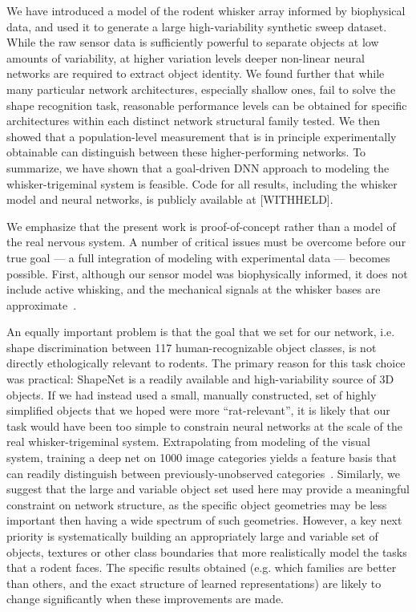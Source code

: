 We have introduced a model of the rodent whisker array informed by biophysical data, and used it to generate a large high-variability synthetic sweep dataset. 
While the raw sensor data is sufficiently powerful to separate objects at low amounts of variability, at higher variation levels deeper non-linear neural networks are required to extract object identity. 
We found further that while many particular network architectures, especially shallow ones, fail to solve the shape recognition task, reasonable performance levels can be obtained for specific architectures within each distinct network structural family tested.
We then showed that a population-level measurement that is in principle experimentally obtainable can distinguish between these higher-performing networks. 
To summarize, we have shown that a goal-driven DNN approach to modeling the whisker-trigeminal system is feasible. 
Code for all results, including the whisker model and neural networks, is publicly available at [WITHHELD].

We emphasize that the present work is proof-of-concept rather than a model of the real nervous system.
A number of critical issues must be overcome before our true goal --- a full integration of modeling with experimental data --- becomes possible.    
First, although our sensor model was biophysically informed, it does not include active whisking, and the mechanical signals at the whisker bases are approximate~\cite{Quist2014, Huet2016}.

An equally important problem is that the goal that we set for our network, i.e. shape discrimination between 117 human-recognizable object classes, is not directly ethologically relevant to rodents. 
The primary reason for this task choice was practical: ShapeNet is a readily available and high-variability source of 3D objects. 
If we had instead used a small, manually constructed, set of highly simplified objects that we hoped were more ``rat-relevant'', it is likely that our task would have been too simple to constrain neural networks at the scale of the real whisker-trigeminal system. 
Extrapolating from modeling of the visual system, training a deep net on 1000 image categories yields a feature basis that can readily distinguish between previously-unobserved categories~\cite{Yamins2014,cadieu2014deep,razavian2014cnn}.
Similarly, we suggest that the large and variable object set used here may provide a meaningful constraint on network structure, as the specific object geometries may be less important then having a wide spectrum of such geometries. 
However, a key next priority is systematically building an appropriately large and variable set of objects, textures or other class boundaries that more realistically model the tasks that a rodent faces.
The specific results obtained (e.g. which families are better than others, and the exact structure of learned representations) are likely to change significantly when these improvements are made.  

